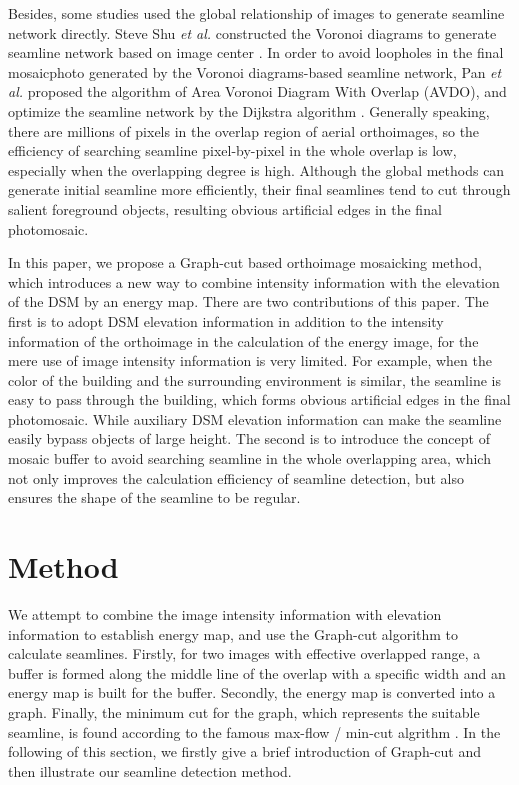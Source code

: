 \documentclass[journal]{IEEEtran}
\begin{document}
Besides, some studies used the global relationship of images to generate seamline network directly. Steve Shu \textit{et al.} constructed the Voronoi diagrams to generate seamline network based on image center \cite{Hsu2002}. In order to avoid loopholes in the final mosaicphoto generated by the Voronoi diagrams-based seamline network, Pan \textit{et al.} proposed the algorithm of Area Voronoi Diagram With Overlap (AVDO), and optimize the seamline network by the Dijkstra algorithm \cite{Pan2009,Pan2014a}. Generally speaking, there are millions of pixels in the overlap region of aerial orthoimages, so the efficiency of searching seamline pixel-by-pixel in the whole overlap is low, especially when the overlapping degree is high. Although the global methods can generate initial seamline more efficiently, their final seamlines tend to cut through salient foreground objects, resulting obvious artificial edges in the final photomosaic. 

In this paper, we propose a Graph-cut based orthoimage mosaicking method, which introduces a new way to combine intensity information with the elevation of the DSM by an energy map. There are two contributions of this paper. The first is to adopt DSM elevation information in addition to the intensity information of the orthoimage in the calculation of the energy image, for the mere use of image intensity information is very limited. For example, when the color of the building and the surrounding environment is similar, the seamline is easy to pass through the building, which forms obvious artificial edges in the final photomosaic. While auxiliary DSM elevation information can make the seamline easily bypass objects of large height. The second is to introduce the concept of mosaic buffer to avoid searching seamline in the whole overlapping area, which not only improves the calculation efficiency of seamline detection, but also ensures the shape of the seamline to be regular.

\section{Method}
We attempt to combine the image intensity information with elevation information to establish energy map, and use the Graph-cut algorithm to calculate seamlines. Firstly, for two images with effective overlapped range, a buffer is formed along the middle line of the overlap with a specific width and an energy map is built for the buffer. Secondly, the energy map is converted into a graph. Finally, the minimum cut for the graph, which represents the suitable seamline, is found according to the famous max-flow / min-cut algrithm \cite{Boykov2004}. In the following of this section, we firstly give a brief introduction of Graph-cut and then illustrate our seamline detection method.\par
\end{document}
